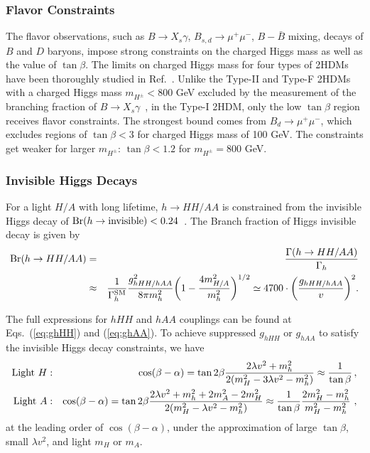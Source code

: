 \documentclass[letterpaper,11pt]{article}
\newcommand{\tanb}{\tan \beta}
\def\cosba{\cos(\beta-\alpha)}
\begin{document}
\subsubsection{Flavor Constraints}

The flavor observations,  such as $B\rightarrow X_s \gamma$, $B_{s,d}\rightarrow \mu^+\mu^-$, $B-\bar{B}$ mixing, decays of $B$ and $D$ baryons, impose strong constraints on the charged Higgs mass as well as the value of $\tan\beta$.  The limits on charged Higgs mass for four types of 2HDMs have been thoroughly studied in Ref.~\cite{Haller:2018nnx}.  Unlike the Type-II and Type-F 2HDMs with a charged Higgs mass $m_{H^\pm}<800$ GeV   excluded by the measurement of the branching fraction of $B\to X_s\gamma$~\cite{Atkinson:2021eox,Misiak:2020vlo}, in the Type-I 2HDM, only the low $\tan\beta$ region receives flavor constraints.  The strongest bound comes from $B_d \rightarrow \mu^+\mu^-$, which excludes regions of $\tan\beta<3$ for charged Higgs mass of 100 GeV.  The constraints get weaker for larger $m_{H^\pm}$: $\tan\beta<1.2$  for $m_{H^\pm}=800$ GeV.

 
 
\subsubsection{Invisible Higgs Decays}


For a light $H/A$ with long lifetime, $h\to HH/AA$ is constrained from the
invisible Higgs decay of ${\rm Br}(h\to {\rm invisible})<0.24$~\cite{Khachatryan:2016whc,Aad:2015txa,Aaboud:2017bja}.   
% 
The Branch fraction of Higgs invisible decay is given by~\cite{Feng:2017vli} 
%
\begin{eqnarray}
{\rm Br}(h\to HH/AA) &=& \frac{\Gamma(h\to HH/AA)}{\Gamma_h} \nonumber \\
&\approx&  \frac{1}{\Gamma_h^{\rm SM}}\frac{g_{hHH/hAA}^2}{8\pi m_h^2}\biggl(1-\frac{4m_{H/A}^2}{m_h^2}\biggr)^{1/2}\simeq 4700\cdot \biggl(\frac{g_{hHH/hAA}}{v} \biggr)^2.
\label{eq:brhphiphi}
\end{eqnarray}

The full expressions for $hHH$ and $hAA$ couplings can be found at Eqs.~(\ref{eq:ghHH}) and (\ref{eq:ghAA}). To achieve suppressed $g_{hHH}$ or $g_{hAA}$ to satisfy the invisible Higgs decay constraints,  we have
\begin{eqnarray}
    {\rm Light} ~H: &&\cosba=\tan 2\beta\frac{2\lambda v^2+m_h^2}{2(m_H^2-3\lambda v^2-m_h^2)} 
    \approx \frac{1}{\tan\beta}\, , \\
    {\rm Light} ~A: &&\cosba=\tan 2\beta\frac{2\lambda v^2+m_h^2+2m_A^2-2m_H^2}{2(m_H^2-\lambda v^2-m_h^2)} \approx \frac{1}{\tan\beta} \frac{2 m_H^2- m_h^2}{ m_H^2-m_h^2} \ ,
    \label{eq:BRh_zero}
\end{eqnarray}
at the leading order of $\cosba$, under the approximation of large $\tanb$, small $\lambda v^2$, and light $m_H$ or $m_A$.  
\end{document}
